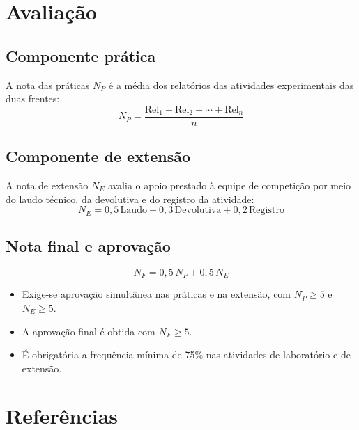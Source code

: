 \documentclass[11pt,a4paper]{article}
\begin{document}
\section{Avaliação}

\subsection*{Componente prática}

A nota das práticas $N_P$ é a média dos relatórios das atividades experimentais das duas frentes:
\[
N_P = \frac{\text{Rel}_1 + \text{Rel}_2 + \cdots + \text{Rel}_n}{n}
\]

\subsection*{Componente de extensão}

A nota de extensão $N_E$ avalia o apoio prestado à equipe de competição por meio do laudo técnico, da devolutiva e do registro da atividade:
\[
N_E = 0{,}5\,\text{Laudo} + 0{,}3\,\text{Devolutiva} + 0{,}2\,\text{Registro}
\]

\subsection*{Nota final e aprovação}

\[
N_F = 0{,}5\,N_P + 0{,}5\,N_E
\]

\begin{itemize}[noitemsep]
  \item Exige-se aprovação simultânea nas práticas e na extensão, com $N_P \geq 5$ e $N_E \geq 5$.
  \item A aprovação final é obtida com $N_F \geq 5$.
  \item É obrigatória a frequência mínima de 75\% nas atividades de laboratório e de extensão.
\end{itemize}

\section{Referências}

\nocite{lathi2019modern, haykin2009communication, couch2013digital, proakis2001digital, carlson2002communication}
\printbibliography[heading=none]
\end{document}
